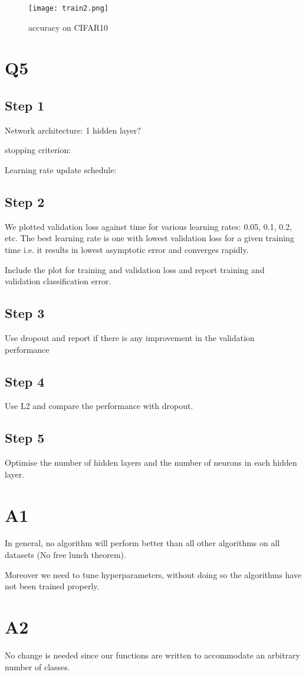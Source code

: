 \documentclass[12pt, a4paper]{article}
\begin{document}
\begin{figure}
\centering
\texttt{[image: train2.png]}
\caption{accuracy on CIFAR10}
\end{figure}

\section*{Q5}

\subsection*{Step 1}
Network architecture: 1 hidden layer?\par
stopping criterion:\par
Learning rate update schedule:\par

\subsection*{Step 2}
We plotted validation loss against time for various learning rates: 0.05, 0.1, 0.2, etc. The best learning rate is one with lowest validation loss for a given training time i.e. it results in lowest asymptotic error and converges rapidly.\par
\bigskip
Include the plot for training and validation loss and report training and validation classification error.

\subsection*{Step 3}
Use dropout and report if there is any improvement in the validation performance

\subsection*{Step 4}
Use L2 and compare the performance with dropout.

\subsection*{Step 5}
Optimise the number of hidden layers and the number of neurons in each hidden layer.

\section*{A1}
In general, no algorithm will perform better than all other algorithms on all datasets (No free lunch theorem).\par
\bigskip
Moreover we need to tune hyperparameters, without doing so the algorithms have not been trained properly.

\section*{A2}
No change is needed since our functions are written to accommodate an arbitrary number of classes.
\end{document}
